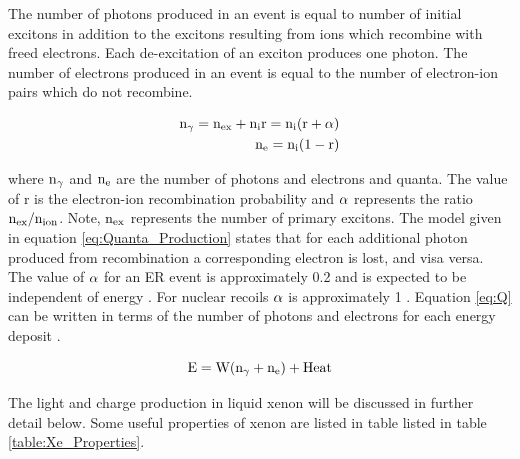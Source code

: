 The number of photons produced in an event is equal to number of  initial excitons in addition to the excitons resulting from ions which recombine with freed electrons. Each de-excitation of an exciton produces one photon. The number of electrons produced in an event is equal to the number of electron-ion pairs which do not recombine.

\begin{equation}
\begin{split}
\rm  n_\gamma = n_{ex} + n_i r = n_i (r+\alpha) \\
\rm  n_e = n_i (1-r)
\label{eq:Quanta_Production}
\end{split}
\end{equation}

\noindent where $\rm n_\gamma$ and $\rm n_e$ are the number of photons and electrons and quanta. The value of r is the electron-ion recombination probability and $\rm \alpha$ represents the ratio $\rm n_{ex}/n_{ion}$. Note, $\rm n_{ex}$ represents the number of primary excitons. The model given in equation \ref{eq:Quanta_Production} states that for each additional photon produced from recombination a corresponding electron is lost, and visa versa. The value of $\rm \alpha$ for an ER event is approximately 0.2 and is expected to be independent of energy \cite{Doke_alpha} \cite{alpha_argon}. For nuclear recoils $\rm \alpha$ is approximately 1 \cite{Dahl_Thesis}. Equation \ref{eq:Q} can be written in terms of the number of photons and electrons for each energy deposit \cite{Platzman}.

\begin{equation}
\rm E= W (n_\gamma + n_e) + Heat \\
\label{eq:E_Q2}
\end{equation}

\noindent The light and charge production in liquid xenon will be discussed in further detail below. Some useful properties of xenon are listed in table listed in table \ref{table:Xe_Properties}. 

